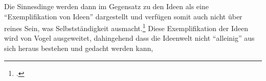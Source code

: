 Die Sinnesdinge werden dann im Gegensatz zu den Ideen als eine \enquote{Exemplifikation von Ideen} dargestellt und verfügen somit auch nicht über reines Sein, was Selbstständigkeit ausmacht.\footcite[vgl.][S. 146]{GraeserPhiloGeschichte}
Diese Exemplifikation der Ideen wird von Vogel ausgeweitet, dahingehend dass die Ideenwelt nicht \enquote{alleinig} aus sich heraus bestehen und gedacht werden kann,
